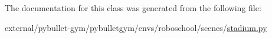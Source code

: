 The documentation for this class was generated from the following file\+:\begin{DoxyCompactItemize}
\item 
external/pybullet-\/gym/pybulletgym/envs/roboschool/scenes/\hyperlink{roboschool_2scenes_2stadium_8py}{stadium.\+py}\end{DoxyCompactItemize}
